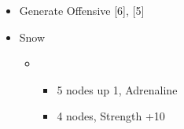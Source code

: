 	\begin{menu}
		\begin{itemize}
			\paradigm
			\begin{itemize}
				\item Generate Offensive [6], [5]
			\end{itemize}
			\crystarium
			\begin{itemize}
				\item Snow
				      \begin{itemize}
					      \item \com
					            \begin{itemize}
						            \item 5 nodes up 1, Adrenaline
						            \item 4 nodes, Strength +10
					            \end{itemize}
				      \end{itemize}
			\end{itemize}
		\end{itemize}
	\end{menu}
	\vfill
	\renewcommand{\first}{[1] Slash \& Burn (\com/\rav)}
	\renewcommand{\second}{[2] War \& Peace (\com/\med)}
	\renewcommand{\fifth}{[5] Dualcasting (\rav/\rav)}
	\renewcommand{\sixth}{[6] Dualcasting (\rav/\rav)}
